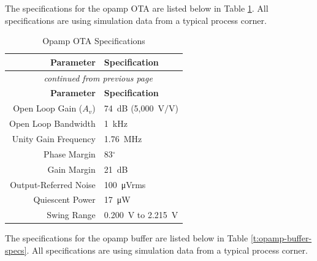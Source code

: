 The specifications for the opamp OTA are listed below in Table \ref{t:opamp-ota-specs}. All specifications are using simulation data from a typical process corner.

\begin{longtable}[c]{ r l }
	\caption{Opamp OTA Specifications} \label{t:opamp-ota-specs} \\ \hline
	\textbf{Parameter} & \textbf{Specification} \\ \hline \endfirsthead

	\multicolumn{2}{c}{\textit{\tablename\ \thetable\ continued from previous page}} \\ \hline
	\textbf{Parameter} & \textbf{Specification} \\ \hline \endhead

	Open Loop Gain ($A_v$) & 74~dB (5,000~$\si{\volt}/\si{\volt}$) \\
	\rowcolor{tablehighlightcolor}
	Open Loop Bandwidth & 1~\si{\kilo\hertz} \\
	Unity Gain Frequency & 1.76~\si{\mega\hertz} \\
	\rowcolor{tablehighlightcolor}
	Phase Margin & 83$^\circ$ \\
	Gain Margin & 21~dB \\
	\rowcolor{tablehighlightcolor}
	Output-Referred Noise & 100~\si{\micro\volt}rms \\
	Quiescent Power & 17~\si{\micro\watt} \\
	\rowcolor{tablehighlightcolor}
	Swing Range & 0.200~\si{\volt} to 2.215~\si{\volt} \\
	\hline
\end{longtable}

The specifications for the opamp buffer are listed below in Table \ref{t:opamp-buffer-specs}. All specifications are using simulation data from a typical process corner.

